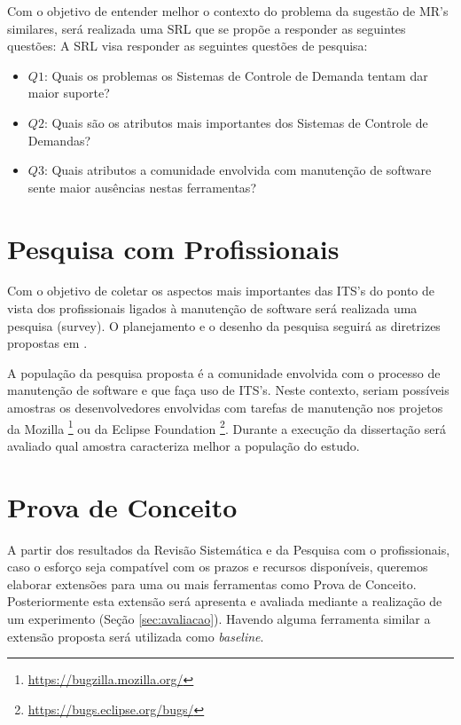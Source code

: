 \documentclass[msc,proposal,hidelot,hideabstract]{ppgccufmg} %
\begin{document}
Com o objetivo de entender melhor o contexto do problema da sugestão de MR's
similares, será realizada uma SRL que se propõe a responder as seguintes
questões:  A SRL visa responder as seguintes questões de
pesquisa:

\begin{itemize}
  \item \textbf{$Q1$}: Quais os problemas os Sistemas de Controle de Demanda tentam dar maior suporte?
  \item \textbf{$Q2$}: Quais são os atributos mais importantes dos Sistemas de
    Controle de Demandas?
  \item \textbf{$Q3$}: Quais atributos a comunidade envolvida com manutenção de
    software sente maior ausências nestas ferramentas?
  \end{itemize}

\section{Pesquisa com Profissionais}
\label{sec:survey}
Com o objetivo de coletar os aspectos mais importantes das ITS's do ponto de
vista dos profissionais ligados à manutenção de software será realizada uma
 pesquisa (survey). O planejamento e o desenho da pesquisa seguirá
as diretrizes propostas em \cite{wohlin2012experimentation}.

A população da pesquisa proposta é a comunidade envolvida com o processo de
manutenção de software e que faça uso de ITS's. Neste contexto, seriam
possíveis amostras os desenvolvedores envolvidas com tarefas de manutenção nos
projetos da Mozilla \footnote{\url{https://bugzilla.mozilla.org/}} ou da
Eclipse Foundation \footnote{\url{https://bugs.eclipse.org/bugs/}}. Durante a
execução da dissertação será avaliado qual amostra caracteriza melhor a
população do estudo.

\section{Prova de Conceito}
\label{sec:prova-conceito}

A partir dos resultados da Revisão Sistemática e da Pesquisa com o
profissionais, caso o esforço seja compatível com os prazos e recursos disponíveis, queremos
elaborar extensões para uma ou mais ferramentas como Prova de Conceito. Posteriormente esta extensão
será apresenta e avaliada mediante a realização de um experimento (Seção
\ref{sec:avaliacao}). Havendo alguma ferramenta similar a extensão proposta será utilizada como \textit{baseline}.
\end{document}
